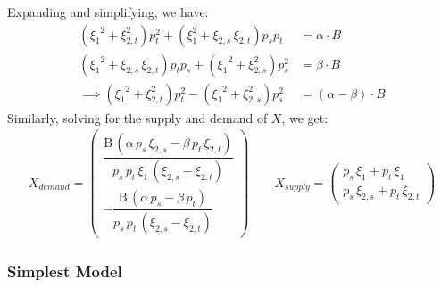 \documentclass[12pt,a4paper]{extarticle}
\begin{document}
Expanding and simplifying, we have:
\begin{align*}
({\xi _{1}}^2+\xi _{2,t}^2)p_t^2 +  (\xi _{1}^2+\xi _{2,s}\,\xi _{2,t})p_s p_t &= \alpha \cdot B \\
({\xi _{1}}^2+\xi _{2,s}\,\xi _{2,t}) p_t p_s + ({\xi _{1}}^2+\xi _{2,s}^2 ) p_s^2 &= \beta \cdot B \\
\implies ({\xi _{1}}^2+\xi _{2,t}^2)p_t^2 - ({\xi _{1}}^2+\xi _{2,s}^2 ) p_s^2 &= (\alpha - \beta) \cdot B
\end{align*}
Similarly, solving for the supply and demand of $X$, we get:
\begin{align*}
X_{demand} = 
\begin{pmatrix}
\dfrac{\mathrm{B}\,\left(\alpha \,p_{s}\,\xi _{2,s}-\beta\,p_{t}\,\xi _{2,t}\right)}{p_{s}\,p_{t}\,\xi _{1}\,\left(\xi _{2,s}-\xi _{2,t}\right)}\\[3ex] -\dfrac{\mathrm{B}\,\left(\alpha \,p_{s}-\beta\,p_{t}\right)}{p_{s}\,p_{t}\,\left(\xi _{2,s}-\xi _{2,t}\right)}
\end{pmatrix}  \qquad
X_{supply} = 
\begin{pmatrix}
p_{s}\,\xi _{1}+p_{t}\,\xi _{1}\\[1ex]
 p_{s}\,\xi _{2,s}+p_{t}\,\xi _{2,t}
\end{pmatrix}
\end{align*}
	

\subsubsection{Simplest Model}
	
\end{document}

